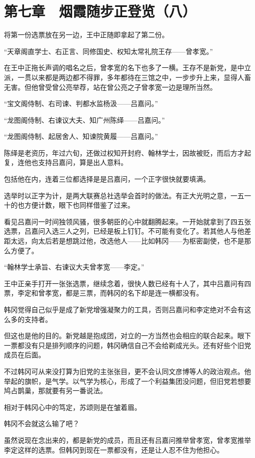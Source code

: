 \section{第七章　烟霞随步正登览（八）}

将第一份选票放在另一边，王中正随即拿起了第二份。

“天章阁直学士、右正言、同修国史、权知太常礼院王存——曾孝宽。”

在王中正拖长声调的唱名之后，曾孝宽的名下也多了一横。王存不是新党，是中立派，一贯以来都是两边都不得罪，多年都待在三馆之中，一步步升上来，显得人畜无害。但他曾受曾公亮举荐，站在曾公亮之子曾孝宽一边是理所当然。

“宝文阁侍制、右司谏、判都水监杨汲——吕嘉问。”

“龙图阁侍制、右谏议大夫、知广州陈绎——吕嘉问。”

“龙图阁侍制、起居舍人、知谏院黄履——吕嘉问。”

陈绎是老资历，年过六旬，还做过权知开封府、翰林学士，因故被贬，而后方才起复，连他也支持吕嘉问，算是出人意料。

包括他在内，连着三位都选择是是吕嘉问，一个正字很快就要填满。

选举时以正字为计，是两大联赛总社选举会首时的做法。有正大光明之意，一五一十的也方便计数，眼下也同样借鉴了过来。

看见吕嘉问一时间独领风骚，很多朝臣的心中就翻腾起来。一开始就拿到了四五张选票，吕嘉问入选三人之列，已经是板上钉钉。不可能有变化了。若其他人与他差距太远，向太后若是想跳过他，改选他人——比如韩冈——为枢密副使，也不是那么方便了。

“翰林学士承旨、右谏议大夫曾孝宽——李定。”

王中正亲手打开一张张选票，继续念着，很快人数已经有十人了，其中吕嘉问有四票，李定和曾孝宽，都是三票，而韩冈的名下却是连一横都没有。

韩冈觉得自己似乎是成了新党增强凝聚力的工具，否则吕嘉问和李定绝对不会有这么多的支持者。

但这也是他的目的。新党越是抱成团，对立的一方当然也会相应的联合起来。眼下一票都没有只是排列顺序的问题，韩冈确信自己不会给剃成光头。还有好些个旧党成员在后面。

不过韩冈可从来没打算为旧党的主张张目，更不会认同文彦博等人的政治观点。他举起的旗帜，是气学。以气学为核心，形成了一个利益集团没问题，但旧党若想要鸠占鹊巢，那就要有另一番说法。

相对于韩冈心中的笃定，苏颂则是在皱着眉。

韩冈不会就这么输了吧？

虽然说现在念出来的，都是新党的成员，而且还有吕嘉问推举曾孝宽，曾孝宽推举李定这样的选票。但韩冈到现在一票都没有，还是让人忍不住为他担心。

